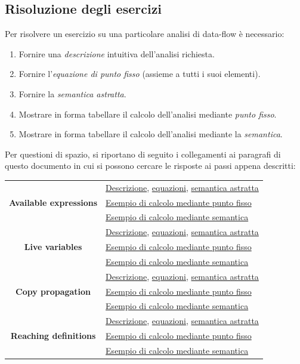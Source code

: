 \documentclass[a4paper,oneside,titlepage]{book}
\begin{document}
\subsection{Risoluzione degli esercizi}
Per risolvere un esercizio su una particolare analisi di data-flow è necessario:
\begin{enumerate}
    \item Fornire una \textit{descrizione} intuitiva dell'analisi richiesta.
    \item Fornire l'\textit{equazione di punto fisso} (assieme a tutti i suoi elementi).
    \item Fornire la \textit{semantica astratta}.
    \item Mostrare in forma tabellare il calcolo dell'analisi mediante \textit{punto fisso}.
    \item Mostrare in forma tabellare il calcolo dell'analisi mediante la \textit{semantica}.
\end{enumerate}
Per questioni di spazio, si riportano di seguito i collegamenti ai paragrafi di questo documento in cui si possono cercare le risposte ai passi appena descritti:
\begin{center}
\begin{tabular}{cl}
	\toprule
	\multirow{3}{*}{\textbf{Available expressions}} & \hyperref[avail1]{Descrizione}, \hyperref[avail2]{equazioni}, \hyperref[avail3]{semantica astratta} \\
	& \hyperref[avail4]{Esempio di calcolo mediante punto fisso} \\
	& \hyperref[avail5]{Esempio di calcolo mediante semantica} \\
	\midrule
	\multirow{3}{*}{\textbf{Live variables}} & \hyperref[live1]{Descrizione}, \hyperref[live2]{equazioni}, \hyperref[live3]{semantica astratta} \\
	& \hyperref[live4]{Esempio di calcolo mediante punto fisso} \\
	& \hyperref[live5]{Esempio di calcolo mediante semantica} \\
	\midrule
	\multirow{3}{*}{\textbf{Copy propagation}} & \hyperref[copy1]{Descrizione}, \hyperref[copy2]{equazioni}, \hyperref[copy3]{semantica astratta} \\
	& \hyperref[copy4]{Esempio di calcolo mediante punto fisso} \\
	& \hyperref[copy5]{Esempio di calcolo mediante semantica} \\
	\midrule
	\multirow{3}{*}{\textbf{Reaching definitions}} & \hyperref[rd1]{Descrizione}, \hyperref[rd2]{equazioni}, \hyperref[rd3]{semantica astratta} \\
	& \hyperref[rd4]{Esempio di calcolo mediante punto fisso} \\
	& \hyperref[rd5]{Esempio di calcolo mediante semantica} \\
	\bottomrule
\end{tabular}
\end{center}
\end{document}
